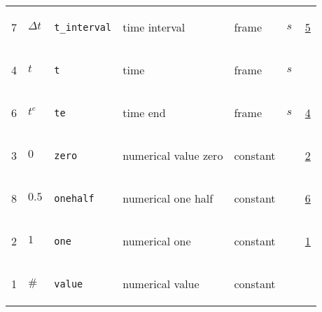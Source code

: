 \begin{longtable}{|p{1cm}|p{2.5cm}|p{4.5cm}|p{8cm}|p{3.0cm}|p{3cm}|p{1cm}|}
                 \\
            7
             & \hypertarget{"v:7"}{ $ {{\Delta t}}{_{}} $}
             & \verb|t_interval|
             & time interval
             & \begin{lay}frame \end{lay}
             & $ s \, $
             &                 \hyperlink{"e:5"}{ 5 }
                 \\
            4
             & \hypertarget{"v:4"}{ $ {t}{_{}} $}
             & \verb|t|
             & time
             & \begin{lay}frame \end{lay}
             & $ s \, $
             & \\
            6
             & \hypertarget{"v:6"}{ $ {{t^e}}{_{}} $}
             & \verb|te|
             & time end
             & \begin{lay}frame \end{lay}
             & $ s \, $
             &                 \hyperlink{"e:4"}{ 4 }
                 \\
            3
             & \hypertarget{"v:3"}{ $ {0}{_{}} $}
             & \verb|zero|
             & numerical value zero
             & \begin{lay}constant \end{lay}
             & $  $
             &                 \hyperlink{"e:2"}{ 2 }
                 \\
            8
             & \hypertarget{"v:8"}{ $ {0.5}{_{}} $}
             & \verb|onehalf|
             & numerical one half
             & \begin{lay}constant \end{lay}
             & $  $
             &                 \hyperlink{"e:6"}{ 6 }
                 \\
            2
             & \hypertarget{"v:2"}{ $ {1}{_{}} $}
             & \verb|one|
             & numerical one
             & \begin{lay}constant \end{lay}
             & $  $
             &                 \hyperlink{"e:1"}{ 1 }
                 \\
            1
             & \hypertarget{"v:1"}{ $ {{\#}}{_{}} $}
             & \verb|value|
             & numerical value
             & \begin{lay}constant \end{lay}
             & $  $
             & \\
    \end{longtable}